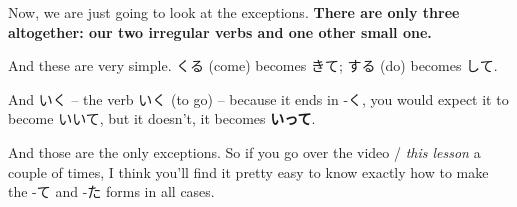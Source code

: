 \startsectionlevel[title={The Exceptions},reference={the-exceptions}]

Now, we are just going to look at the exceptions. {\bf There are only three altogether: our two irregular verbs and one other small one.}

And these are very simple. くる (come) becomes きて; する (do) becomes して.

And いく -- the verb いく (to go) -- because it ends in -く, you would expect it to become いいて, but it doesn't, it becomes {\bf いって}.

{}

And those are the only exceptions. So if you go over the video / {\em this lesson} a couple of times, I think you'll find it pretty easy to know exactly how to make the -て and -た forms in all cases.

\stopsectionlevel

\stopsectionlevel

\stopsectionlevel
